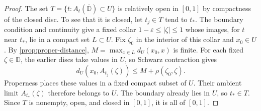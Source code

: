 \begin{proof}
The set $T=\{t:A_t(\overline{\mathbb{D}})\subset U\}$ is relatively open in $[0,1]$ by compactness of the closed disc.  To see that it is closed, let $t_j\in T$ tend to $t_*$.  The boundary condition and continuity give a fixed collar $1-\varepsilon\leq|\zeta|\leq1$ whose images, for $t$ near $t_*$, lie in a compact set $L\subset U$.  Fix $\zeta_0$ in the interior of this collar and $x_0\in U$.  By \cref{prop:proper-distance}, $M=\max_{x\in L}d_U(x_0,x)$ is finite.  For each fixed $\zeta\in\mathbb{D}$, the earlier discs take values in $U$, so Schwarz contraction gives
\[
  d_U(x_0,A_{t_j}(\zeta))
            \leq M+\rho(\zeta_0,\zeta).
\]
Properness places these values in a fixed compact subset of $U$. Their ambient limit $A_{t_*}(\zeta)$ therefore belongs to $U$. The boundary already lies in $U$, so $t_*\in T$.  Since $T$ is nonempty, open, and closed in $[0,1]$, it is all of $[0,1]$.
\end{proof}
